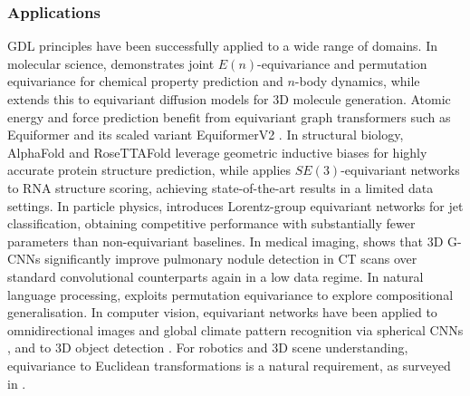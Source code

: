\documentclass[mathematics,review,submit,moreauthors]{Definitions/mdpi}
\begin{document}
\subsubsection{Applications}
GDL principles have been successfully applied to a wide range of domains. In molecular science, \citet{satorras2021p3icml} demonstrates joint $E(n)$-equivariance and permutation equivariance for chemical property prediction and $n$-body dynamics, while \citet{cornet2024} extends this to equivariant diffusion models for 3D molecule generation.
Atomic energy and force prediction benefit from equivariant graph transformers such as Equiformer \citep{liao2022} and its scaled variant EquiformerV2 \citep{liao2023}.
In structural biology, AlphaFold \citep{jumper2021na} and RoseTTAFold \citep{baek2021s} leverage geometric inductive biases for highly accurate protein structure prediction, while \citet{townshend2021s} applies $SE(3)$-equivariant networks to RNA structure scoring, achieving state-of-the-art results in a limited data settings.
In particle physics, \citet{bogatskiy2020p3icml} introduces Lorentz-group equivariant networks for jet classification, obtaining competitive performance with substantially fewer parameters than non-equivariant baselines.
In medical imaging, \citet{winkels2019mia} shows that 3D G-CNNs significantly improve pulmonary nodule detection in CT scans over standard convolutional counterparts again in a low data regime.
In natural language processing, \citet{gordon2020} exploits permutation equivariance to explore compositional generalisation.
In computer vision, equivariant networks have been applied to omnidirectional images and global climate pattern recognition via spherical CNNs \citep{cohen2018,cohen2019p3icml}, and to 3D object detection \citep{yu2022}.
For robotics and 3D scene understanding, equivariance to Euclidean transformations is a natural requirement, as surveyed in \citep{seo2025a,fei2024air}.
\end{document}
